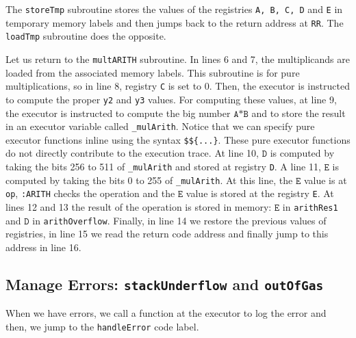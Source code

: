The \texttt{storeTmp} subroutine stores the values of the registries \texttt{A, B, C, D} and \texttt{E} in temporary memory labels and then jumps back to the return address at \texttt{RR}. The \texttt{loadTmp} subroutine does the opposite.



Let us return to the \texttt{multARITH} subroutine. In lines 6 and 7, the multiplicands are loaded from the associated memory labels. This subroutine is for pure multiplications, so in line 8, registry \texttt{C} is set to 0. Then, the executor is instructed to compute the proper \texttt{y2} and \texttt{y3} values. For computing these values, at line 9, the executor is instructed to compute the big number $\texttt{A*B}$ and to store the result in an executor variable called \texttt{\_mulArith}. Notice that we can specify pure executor functions inline using the syntax \texttt{\$\$\{...\}}. These pure executor functions do not directly contribute to the execution trace. At line 10, $\texttt{D}$ is computed by taking the bits 256 to 511 of \texttt{\_mulArith} and stored at registry \texttt{D}. A line 11, $\texttt{E}$ is computed by taking the bits 0 to 255 of \texttt{\_mulArith}. At this line, the $\texttt{E}$ value is at \texttt{op}, \texttt{:ARITH} checks the operation and the $\texttt{E}$ value is stored at the registry \texttt{E}. At lines 12 and 13 the result of the operation is stored in memory: $\texttt{E}$ in \texttt{arithRes1} and $\texttt{D}$ in \texttt{arithOverflow}. Finally, in line 14 we restore the previous values of registries, in line 15 we read the return code address and finally jump to this address in line 16.


\subsection{Manage Errors: \texttt{stackUnderflow} and \texttt{outOfGas}}
When we have errors, we call a function at the executor to log the error and then, we jump to the \texttt{handleError} code label.

